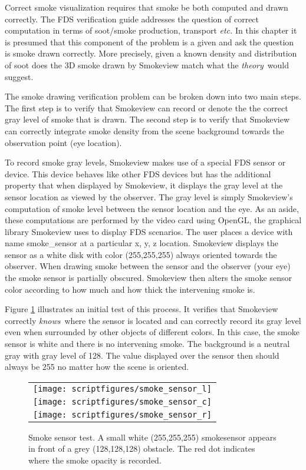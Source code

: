 \documentclass[11pt,twoside]{book}
\newcommand{\figoptions}{hbp}
\begin{document}
Correct smoke visualization requires that smoke be both computed and drawn correctly.  
The FDS verification guide\cite{FDS_5_Verification_Guide} addresses the question of correct 
computation in terms of soot/smoke production, transport {\em etc.}  In this chapter it is presumed that this component of the problem is a given and ask the question is smoke drawn correctly.  More precisely, given a known density and distribution of soot does the 3D smoke drawn by Smokeview match what the {\em theory}\ would suggest.

The smoke drawing verification problem can be broken down into two main steps.  The first step is to verify that Smokeview can record or denote the the correct gray level of smoke that is drawn.  
The second step is to verify that Smokeview can correctly integrate smoke density from the scene background towards the observation point (eye location).

To record smoke gray levels, Smokeview makes use of a special FDS sensor or device.
This device behaves like other FDS devices but has the additional property that when displayed by Smokeview, it displays the gray level at the sensor location as viewed by the observer.  The gray level is simply Smokeview's computation of smoke level between the sensor location and the eye.  As an aside, these computations are performed by the video card using OpenGL, the graphical library Smokeview uses to display FDS scenarios.  The user places a device with name smoke\_sensor at a particular x, y, z location.
Smokeview displays the sensor as a white disk with color (255,255,255) always oriented towards the observer. When drawing smoke between the sensor and the observer (your eye) the smoke sensor is partially obscured.  Smokeview then alters the smoke sensor color according to how much and how thick the intervening smoke is.

Figure \ref{figsmokesensor} illustrates an initial test of this process.  It verifies that Smokeview correctly {\em knows}\ where the sensor is located and can correctly record its gray level even when surrounded by other objects of different colors.  In this case, the smoke sensor is white and there is no intervening smoke.  The background is a neutral gray with gray level of 128.  The value displayed over the sensor then should always be 255 no matter how the scene is oriented.
\begin{figure}[\figoptions]
\begin{center}
 \centering
\begin{tabular}{c}
\texttt{[image: scriptfigures/smoke\_sensor\_l]}\\
\texttt{[image: scriptfigures/smoke\_sensor\_c]}\\
\texttt{[image: scriptfigures/smoke\_sensor\_r]}\\

 \end{tabular}
\end{center}
\caption[Smoke sensor test.]{Smoke sensor test.
A small white (255,255,255) smokesensor appears in front of a grey (128,128,128) obstacle.
The red dot indicates where the smoke opacity is recorded.
}
\label{figsmokesensor}%
\end{figure}
\end{document}
